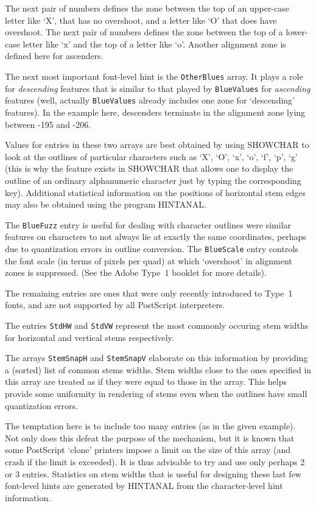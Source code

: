 The next pair of numbers defines the zone between the top of an upper-case
letter like `X', that has no overshoot, and a letter like `O' that
does have overshoot.
The next  pair of numbers defines the zone between the top of a
lower-case letter like `x' and the top of a letter like `o'. 
Another alignment zone is defined here for ascenders.

The next most important font-level hint is the {\tt OtherBlues} array.
It plays a role for {\it descending} features that is similar to that played
by {\tt BlueValues} for {\it ascending} features (well, actually 
{\tt BlueValues} already includes one zone for `descending' features).
In the example here, descenders terminate in the alignment zone lying
between -195 and -206.

Values for entries in these two arrays are best obtained by using SHOWCHAR
to look at the outlines of particular characters such as `X', `O', `x',
`o', `f', `p', `g' (this is why the feature exists in SHOWCHAR  that
allows one to display the outline of an ordinary alphanumeric character
just by typing the corresponding key).  
Additional statistical information on the positions of horizontal stem
edges may also be obtained using the program HINTANAL.

The {\tt BlueFuzz} entry is useful for dealing with character outlines
were similar features on characters to not always lie at exactly the
same coordinates, perhaps due to quantization errors in outline conversion.
The {\tt BlueScale} entry controls the font scale 
(in terms of pixels per quad) 
at which `overshoot' in alignment zones is suppressed.
(See the Adobe Type~1 booklet for more details).

The remaining entries are ones that were only recently introduced to Type~1
fonts, and are not supported by all PostScript interpreters. 

The entries {\tt StdHW} and {\tt StdVW} represent the most commonly
occuring stem widths for horizontal and vertical stems respectively.

The arrays {\tt StemSnapH} and {\tt StemSnapV} elaborate on this
information by providing a (sorted) list of common stems widths.
Stem widths close to the ones specified in this array are treated as if
they were equal to those in the array.  
This helps provide some uniformity in rendering of stems even when the
outlines have small quantization errors.

The temptation here is to include too many entries (as in the given example).
Not only does this defeat the purpose of the mechanism, but it is
known that some PostScript `clone' printers impose a limit on the size
of this array (and crash if the limit is exceeded).
It is thus advisable to try and use only perhaps 2 or 3 entries.
%
Statistics on stem widths that is useful for designing these last few
font-level hints are generated by HINTANAL from the character-level
hint information.

